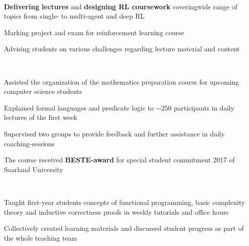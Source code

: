 \documentclass[]{lukas-cv-openfont}
\begin{document}
\noindent
{}
\\
\begin{tightitemize}{1.7em}
    \item \textbf{Delivering lectures} and \textbf{designing RL coursework} coveringwide range of topics from single- to multi-agent and deep RL
    \item Marking project and exam for reinforcement learning course
    \item Advising students on various challenges regarding lecture material and content
\end{tightitemize}
\largesectionsep

\noindent
{}
\\
\begin{tightitemize}{1.7em}
    \item Assisted the organization of the mathematics preparation course for upcoming computer science students%
    \item Explained formal languages and predicate logic to $\sim250$ participants in daily lectures of the first week
    \item Supervised two groups to provide feedback and further assistance in daily coaching-sessions
    \item The course received \textbf{BESTE-award} for special student commitment 2017 of Saarland University
\end{tightitemize}
\largesectionsep

\noindent
{}
\\
\begin{tightitemize}{1.7em}
    \item Taught first-year students concepts of functional programming, basic complexity theory and inductive correctness proofs in weekly tutorials and office hours
    \item Collectively created learning materials and discussed student progress as part of the whole teaching team
\end{tightitemize}
\largesectionsep
\end{document}
